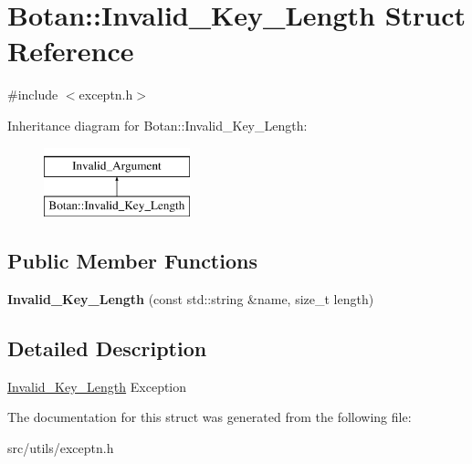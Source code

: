 \hypertarget{structBotan_1_1Invalid__Key__Length}{\section{Botan\-:\-:Invalid\-\_\-\-Key\-\_\-\-Length Struct Reference}
\label{structBotan_1_1Invalid__Key__Length}
}


{\ttfamily \#include $<$exceptn.\-h$>$}

Inheritance diagram for Botan\-:\-:Invalid\-\_\-\-Key\-\_\-\-Length\-:\begin{figure}[H]
\begin{center}
\leavevmode
\includegraphics[height=2.000000cm]{structBotan_1_1Invalid__Key__Length}
\end{center}
\end{figure}
\subsection*{Public Member Functions}
\begin{DoxyCompactItemize}
\item 
\hypertarget{structBotan_1_1Invalid__Key__Length_a8500f2024faf5e47d170ebab24f09a81}{{\bfseries Invalid\-\_\-\-Key\-\_\-\-Length} (const std\-::string \&name, size\-\_\-t length)}\label{structBotan_1_1Invalid__Key__Length_a8500f2024faf5e47d170ebab24f09a81}

\end{DoxyCompactItemize}


\subsection{Detailed Description}
\hyperlink{structBotan_1_1Invalid__Key__Length}{Invalid\-\_\-\-Key\-\_\-\-Length} Exception 

The documentation for this struct was generated from the following file\-:\begin{DoxyCompactItemize}
\item 
src/utils/exceptn.\-h\end{DoxyCompactItemize}
